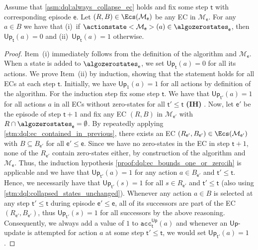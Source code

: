 \documentclass{article}
\makeatletter
\newcommand{\intersectionSym}{\cap}
\newcommand{\intersectionBin}{\mathbin{\intersectionSym}}
\newcommand{\intersection}{\intersectionBin}
\newcommand{\MDP}{\mathcal{M}}
\newcommand{\upperbound}{\mathsf{Up}}
\newcommand{\acc}{\texttt{acc}}
\newcommand{\algostep}{\mathsf{t}}
\newcommand{\algoepisode}{\mathsf{e}}
\def\alabel#1#2{\begingroup
	\textbf{(#2)}\def\@currentlabel{\textbf{[#2]}}\phantomsection\label{#1}\endgroup
}
\makeatother
\begin{document}
\begin{lemma} \label{stm:dql:ec_bounds_one_or_zero}
	Assume that \cref{asm:dql:always_collapse_ec} holds and fix some step $\algostep$ with corresponding episode $\algoepisode$.
	Let $(R, B) \in \Ecs(\MDP_\algoepisode)$ be any EC in $\MDP_\algoepisode$.
	For any $a \in B$ we have that (i)~if $\actionstate<\MDP_\algoepisode>(a) \in \algozerostates_\algoepisode$, then $\upperbound_\algostep(a) = 0$ and (ii)~$\upperbound_\algostep(a) = 1$ otherwise.
\end{lemma}

\begin{proof}
	Item~(i) immediately follows from the definition of the algorithm and $\MDP_\algoepisode$.
	When a state is added to $\algozerostates_\algoepisode$, we set $\upperbound_\algostep(a) = 0$ for all its actions.
	We prove Item~(ii) by induction, showing that the statement holds for all ECs at each step $\algostep$.
	Initially, we have $\upperbound_1(a) = 1$ for all actions by definition of the algorithm.
	For the induction step fix some step $\algostep$.
	We have that $\upperbound_{\algostep'}(a) = 1$ for all actions $a$ in all ECs without zero-states for all $\algostep' \leq \algostep$ \alabel{proof:dql:ec_bounds_one_or_zero:ih}{IH}.
	Now, let $\algoepisode'$ be the episode of step $\algostep + 1$ and fix any EC $(R, B)$ in $\MDP_{\algoepisode'}$ with $R \intersection \algozerostates_\algoepisode = \emptyset$.
	By repeatedly applying \cref{stm:dql:ec_contained_in_previous}, there exists an EC $(R_{\algoepisode'}, B_{\algoepisode'}) \in \Ecs(\MDP_{\algoepisode'})$ with $B \subseteq B_{\algoepisode'}$ for all $\algoepisode' \leq \algoepisode$.
	Since we have no zero-states in the EC in step $\algostep + 1$, none of the $R_{\algoepisode'}$ contain zero-states either, by construction of the algorithm and $\MDP_\algoepisode$.
	Thus, the induction hypothesis \ref{proof:dql:ec_bounds_one_or_zero:ih} is applicable and we have that $\upperbound_{\algostep'}(a) = 1$ for any action $a \in B_{\algoepisode'}$ and $\algostep' \leq \algostep$.
	Hence, we necessarily have that $\upperbound_{\algostep'}(s) = 1$ for all $s \in R_{\algoepisode'}$ and $\algostep' \leq \algostep$ (also using \cref{stm:dql:collapsed_states_unchanged}).
	Whenever any action $a \in B$ is selected at any step $\algostep' \leq \algostep$ during episode $\algoepisode' \leq \algoepisode$, all of its successors are part of the EC $(R_{\algoepisode'}, B_{\algoepisode'})$, thus $\upperbound_{\algostep'}(s) = 1$ for all successors by the above reasoning.
	Consequently, we always add a value of $1$ to $\acc_\algostep^\upperbound(a)$ and whenever an $\upperbound$-update is attempted for action $a$ at some step $\algostep' \leq \algostep$, we would set $\upperbound_{\algostep'}(a) = 1$. 
\end{proof}
\end{document}

